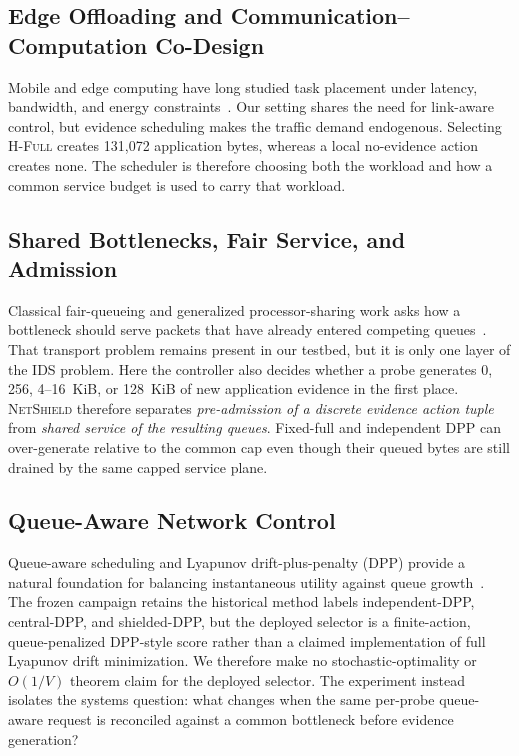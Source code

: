 \documentclass[10pt,journal]{IEEEtran}
\newcommand{\NetShield}{\textsc{NetShield}}
\newcommand{\Hfull}{\textsc{H-Full}}
\begin{document}
\subsection{Edge Offloading and Communication--Computation Co-Design}
Mobile and edge computing have long studied task placement under latency, bandwidth, and energy constraints~\cite{mao2017mec,mach2017mec,chen2016offloading,mao2016dynamic}. Our setting shares the need for link-aware control, but evidence scheduling makes the traffic demand endogenous. Selecting \Hfull{} creates 131,072 application bytes, whereas a local no-evidence action creates none. The scheduler is therefore choosing both the workload and how a common service budget is used to carry that workload.

\subsection{Shared Bottlenecks, Fair Service, and Admission}
Classical fair-queueing and generalized processor-sharing work asks how a bottleneck should serve packets that have already entered competing queues~\cite{demers1989fair,parekh1993gps}. That transport problem remains present in our testbed, but it is only one layer of the IDS problem. Here the controller also decides whether a probe generates 0, 256, 4--16~KiB, or 128~KiB of new application evidence in the first place. \NetShield{} therefore separates \emph{pre-admission of a discrete evidence action tuple} from \emph{shared service of the resulting queues}. Fixed-full and independent DPP can over-generate relative to the common cap even though their queued bytes are still drained by the same capped service plane.

\subsection{Queue-Aware Network Control}
Queue-aware scheduling and Lyapunov drift-plus-penalty (DPP) provide a natural foundation for balancing instantaneous utility against queue growth~\cite{tassiulas1992stability,neely2010stochastic}. The frozen campaign retains the historical method labels independent-DPP, central-DPP, and shielded-DPP, but the deployed selector is a finite-action, queue-penalized DPP-style score rather than a claimed implementation of full Lyapunov drift minimization. We therefore make no stochastic-optimality or $O(1/V)$ theorem claim for the deployed selector. The experiment instead isolates the systems question: what changes when the same per-probe queue-aware request is reconciled against a common bottleneck before evidence generation?
\end{document}
